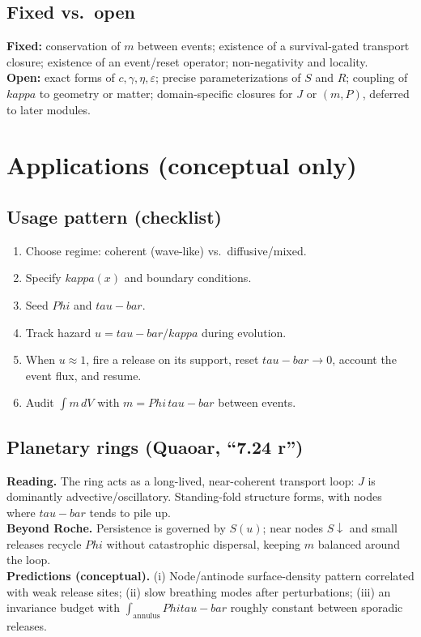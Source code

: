 \documentclass[12pt]{article}
\newcommand{\FoldDensity}{\Phi}
\newcommand{\FoldTime}{\bar{\tau}}
\newcommand{\Threshold}{\kappa}
\newcommand{\Survival}{S}
\newcommand{\Release}{R}
\def\FoldDensity{Phi}%
\def\FoldTime{tau-bar}%
\def\Threshold{kappa}%
\def\Survival{S}%
\def\Release{R}%
\def\bar#1{#1}%
\begin{document}
\subsection{Fixed vs.\ open}
\textbf{Fixed:} conservation of $m$ between events; existence of a survival-gated transport closure; existence of an event/reset operator; non-negativity and locality.\\
\textbf{Open:} exact forms of $c,\gamma,\eta,\varepsilon$; precise parameterizations of $\Survival$ and $\Release$; coupling of $\Threshold$ to geometry or matter; domain-specific closures for $J$ or $(m,P)$, deferred to later modules.


\section{Applications (conceptual only)}

\subsection{Usage pattern (checklist)}
\begin{enumerate}
  \item Choose regime: coherent (wave-like) vs.\ diffusive/mixed.
  \item Specify $\Threshold(x)$ and boundary conditions.
  \item Seed $\FoldDensity$ and $\FoldTime$.
  \item Track hazard $u=\FoldTime/\Threshold$ during evolution.
  \item When $u\approx 1$, fire a release on its support, reset $\FoldTime\to 0$, account the event flux, and resume.
  \item Audit $\int m\,dV$ with $m=\FoldDensity\,\FoldTime$ between events.
\end{enumerate}

\subsection{Planetary rings (Quaoar, ``7.24 r'')}
\textbf{Reading.} The ring acts as a long-lived, near-coherent transport loop: $J$ is dominantly advective/oscillatory. Standing-fold structure forms, with nodes where $\FoldTime$ tends to pile up.\\
\textbf{Beyond Roche.} Persistence is governed by $\Survival(u)$; near nodes $\Survival\!\downarrow$ and small releases recycle $\FoldDensity$ without catastrophic dispersal, keeping $m$ balanced around the loop.\\
\textbf{Predictions (conceptual).} (i) Node/antinode surface-density pattern correlated with weak release sites; (ii) slow breathing modes after perturbations; (iii) an invariance budget with $\int_{\text{annulus}} \FoldDensity\FoldTime$ roughly constant between sporadic releases.
\end{document}
